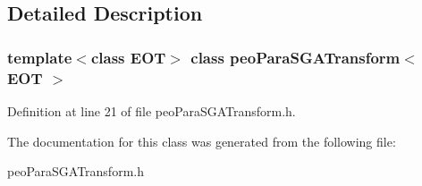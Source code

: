 \subsection{Detailed Description}
\subsubsection*{template$<$class EOT$>$ class peo\-Para\-SGATransform$<$ EOT $>$}





Definition at line 21 of file peo\-Para\-SGATransform.h.

The documentation for this class was generated from the following file:\begin{CompactItemize}
\item 
peo\-Para\-SGATransform.h\end{CompactItemize}
